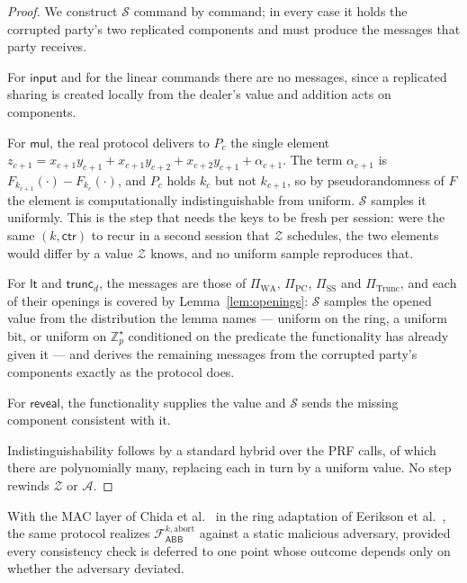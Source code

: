 \documentclass[11pt]{article}
\newcommand{\Z}{\mathbb{Z}}
\newcommand{\Fabb}{\mathcal{F}_{\mathsf{ABB}}}
\begin{document}
\begin{proof}
We construct $\mathcal{S}$ command by command; in every case it holds the
corrupted party's two replicated components and must produce the messages that party receives.

For $\mathsf{input}$ and for the linear commands there are no messages, since a replicated
sharing is created locally from the dealer's value and addition acts on components.

For $\mathsf{mul}$, the real protocol delivers to $P_c$ the single element
$z_{c+1} = x_{c+1}y_{c+1} + x_{c+1}y_{c+2} + x_{c+2}y_{c+1} + \alpha_{c+1}$. The term
$\alpha_{c+1}$ is $F_{k_{c+1}}(\cdot) - F_{k_{c}}(\cdot)$, and $P_c$ holds $k_c$ but not
$k_{c+1}$, so by pseudorandomness of $F$ the element is computationally indistinguishable from
uniform. $\mathcal{S}$ samples it uniformly. This is the step that needs the keys to be fresh
per session: were the same $(k,\mathsf{ctr})$ to recur in a second session that $\mathcal{Z}$
schedules, the two elements would differ by a value $\mathcal{Z}$ knows, and no uniform sample
reproduces that.

For $\mathsf{lt}$ and $\mathsf{trunc}_d$, the messages are those of
$\Pi_{\mathrm{WA}}$, $\Pi_{\mathrm{PC}}$, $\Pi_{\mathrm{SS}}$ and $\Pi_{\mathrm{Trunc}}$, and
each of their openings is covered by Lemma~\ref{lem:openings}: $\mathcal{S}$ samples the opened
value from the distribution the lemma names --- uniform on the ring, a uniform bit, or uniform
on $\Z_p^\star$ conditioned on the predicate the functionality has already given it --- and
derives the remaining messages from the corrupted party's components exactly as the protocol
does.

For $\mathsf{reveal}$, the functionality supplies the value and $\mathcal{S}$ sends the missing
component consistent with it.

Indistinguishability follows by a standard hybrid over the PRF calls, of which there are
polynomially many, replacing each in turn by a uniform value. No step rewinds $\mathcal{Z}$ or
$\mathcal{A}$.
\end{proof}

\begin{corolary}
\label{cor:mal}
With the MAC layer of Chida et al.~\cite{Chida} in the ring adaptation of Eerikson et
al.~\cite{Eerikson}, the same protocol realizes $\Fabb^{k,\mathrm{abort}}$ against a static
malicious adversary, provided every consistency check is deferred to one point whose outcome
depends only on whether the adversary deviated.
\end{corolary}
\end{document}
